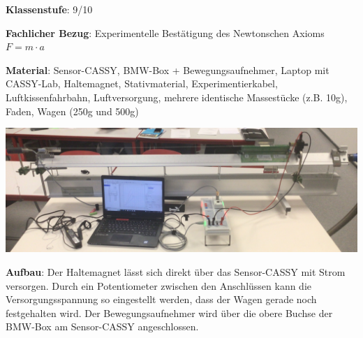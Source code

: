 \documentclass[../main.tex]{subfiles}
\begin{document}
\begin{tcolorbox}[
    width=\textwidth,
    height=\textheight,
    title=Versuch: Newtonsche Bewegungsgleichung,
    fonttitle=\Large,
    before title=\vspace{0.2cm}, after title=\vspace{0.2cm},
    colback=white,
    title filled=true, 
    colbacktitle=mygray,
    colframe=black,
    coltitle=black,
    ]

    \vspace{0.2cm}
    \textbf{Klassenstufe}: 9/10

    \vspace{0.3cm}

    \textbf{Fachlicher Bezug}: Experimentelle Bestätigung des Newtonschen Axioms $F=m\cdot a$

    \vspace{0.3cm}

    \textbf{Material}: 
    Sensor-CASSY, 
    BMW-Box + Bewegungsaufnehmer,
    Laptop mit CASSY-Lab, 
    Haltemagnet, 
    Stativmaterial, 
    Experimentierkabel,
    Luftkissenfahrbahn,  
    Luftversorgung,
    mehrere identische Massestücke (z.B. 10g),
    Faden, 
    Wagen (250g und 500g)

    \begin{center}
        \includegraphics[width=1\textwidth]{img/versuchsaufbau}
    \end{center}

    \textbf{Aufbau}: Der Haltemagnet lässt sich direkt über das Sensor-CASSY mit Strom versorgen. Durch ein Potentiometer zwischen den Anschlüssen kann die Versorgungsspannung so eingestellt werden, dass der Wagen gerade noch festgehalten wird. Der Bewegungsaufnehmer wird über die obere Buchse der BMW-Box am Sensor-CASSY angeschlossen. 


\end{tcolorbox}
\end{document}
